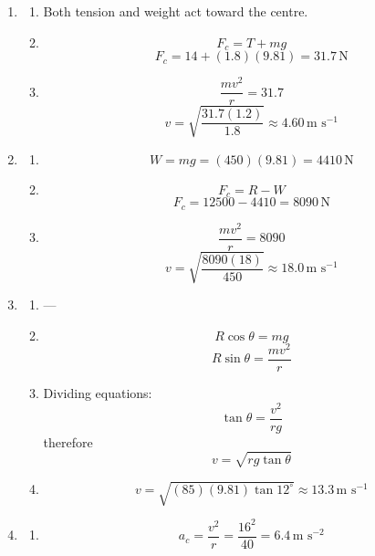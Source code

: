 \documentclass[12pt]{article}
\begin{document}
\begin{enumerate}[label=\textbf{\arabic*.}, itemsep=2em]
\begin{enumerate}[label=(\alph*)]
    \item Top:
    \[
    T+mg=F_c
    \]
    \[
    T=5.56-1.96
    =3.60\,\text{N}
    \]
\end{enumerate}

\item
\begin{enumerate}[label=(\alph*)]
    \item Both tension and weight act toward the centre.

    \item
    \[
    F_c=T+mg
    \]
    \[
    F_c=14+(1.8)(9.81)
    =31.7\,\text{N}
    \]

    \item
    \[
    \frac{mv^2}{r}=31.7
    \]
    \[
    v=\sqrt{\frac{31.7(1.2)}{1.8}}
    \approx 4.60\,\text{m s}^{-1}
    \]
\end{enumerate}

\item
\begin{enumerate}[label=(\alph*)]
    \item
    \[
    W=mg=(450)(9.81)=4410\,\text{N}
    \]

    \item
    \[
    F_c=R-W
    \]
    \[
    F_c=12500-4410
    =8090\,\text{N}
    \]

    \item
    \[
    \frac{mv^2}{r}=8090
    \]
    \[
    v=\sqrt{\frac{8090(18)}{450}}
    \approx 18.0\,\text{m s}^{-1}
    \]
\end{enumerate}

\item
\begin{enumerate}[label=(\alph*)]
    \item ---

    \item
    \[
    R\cos\theta = mg
    \]
    \[
    R\sin\theta = \frac{mv^2}{r}
    \]

    \item Dividing equations:
    \[
    \tan\theta=\frac{v^2}{rg}
    \]
    therefore
    \[
    v=\sqrt{rg\tan\theta}
    \]

    \item
    \[
    v=\sqrt{(85)(9.81)\tan12^\circ}
    \approx 13.3\,\text{m s}^{-1}
    \]
\end{enumerate}

\item
\begin{enumerate}[label=(\alph*)]
    \item
    \[
    a_c=\frac{v^2}{r}
    =\frac{16^2}{40}
    =6.4\,\text{m s}^{-2}
    \]


\end{enumerate}
\end{enumerate}
\end{document}

